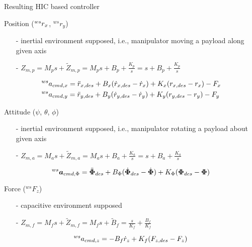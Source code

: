 \begin{frame}[shrink=30]{Resulting HIC based controller}
  \begin{block}{Position ($\prescript{ws}{}{r}_x$, ${}^{ws}r_y$)}
  \begin{itemize}
  \item[-] inertial environment supposed, i.e., manipulator moving a payload along given axis
  \item[-] $Z_{m,p} = M_p s + \tilde{Z}_{m,p} = M_p s + B_p + \frac{K_p}{s} = s + B_p + \frac{K_p}{s} $
  \end{itemize}
  \[
  \begin{split}
    & \prescript{ws}{}{a}_{cmd,x} = \ddot{r}_{x,des} + B_x (\dot{r}_{x,des} - \dot{r}_x) + K_x (r_{x,des} - r_x) - F_x \\
    & \prescript{ws}{}{a}_{cmd,y} = \ddot{r}_{y,des} + B_y (\dot{r}_{y,des} - \dot{r}_y) + K_y (r_{y,des} - r_y) - F_y
    \end{split}
  \]
  \end{block}
  \begin{block}{Attitude ($\psi$, $\theta$, $\phi$)}
    \begin{itemize}
    \item[-] inertial environment supposed, i.e., manipulator rotating a payload about given axis
    \item[-] $Z_{m,a} = M_a s + \tilde{Z}_{m,a} = M_a s + B_a + \frac{K_a}{s} = s + B_a + \frac{K_a}{s}$
    \end{itemize}
    \[ 
    \prescript{ws}{}{\vec{a}}_{cmd,\Phi} = \ddot{\vec{\Phi}}_{des} + B_{\Phi} (\dot{\vec{\Phi}}_{des} - \dot{\vec{\Phi}}) + K_{\Phi} (\vec{\Phi}_{des} - \vec{\Phi})
    \]
  \end{block}
  \begin{block}{Force (${}^{ws}F_z$)}
    \begin{itemize}
    \item[-] capacitive environment supposed
    \item[-] $Z_{m,f} = M_f s + \tilde{Z}_{m,f} = M_f s + \tilde{B}_f = \frac{s}{K_f} + \frac{B_f}{K_f}$
    \end{itemize}
    \[
    \prescript{ws}{}{a}_{cmd,z} = - B_f \dot{r}_z + K_f(F_{z,des} - F_z)
    \]  
  \end{block}
\end{frame}
